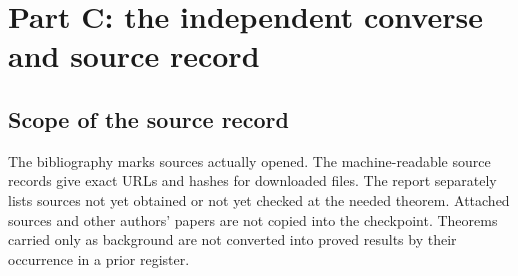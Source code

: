 \documentclass[11pt]{article}
\begin{document}
\section{Part C: the independent converse and source record}
\label{CP2:partC}

\subsection{Scope of the source record}
The bibliography marks sources actually opened. The machine-readable
source records give exact URLs and hashes for downloaded files. The
report separately lists sources not yet obtained or not yet checked at
the needed theorem. Attached sources and other authors' papers are not
copied into the checkpoint. Theorems carried only as background are not
converted into proved results by their occurrence in a prior register.



\end{document}
